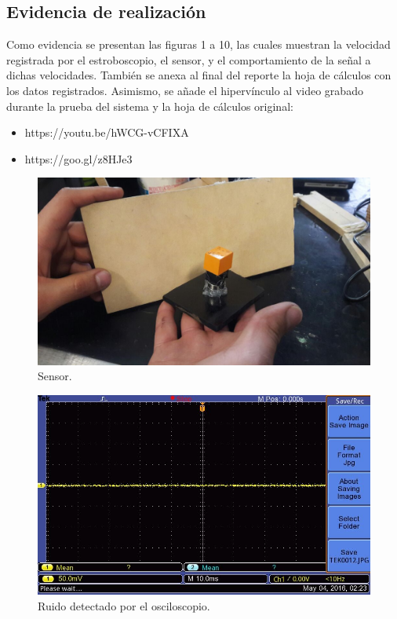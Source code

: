
\subsection{Evidencia de realizaci\'on}
Como evidencia se presentan las figuras 1 a 10, las cuales muestran la velocidad registrada por el
estroboscopio, el sensor, y el comportamiento de la se\~nal a dichas velocidades. Tambi\'en se anexa al final
del reporte la hoja de c\'alculos con los datos registrados. Asimismo, se a\~nade el hiperv\'inculo
al video grabado durante la prueba del sistema y la hoja de c\'alculos original:
\begin{itemize}
 \item https://youtu.be/hWCG-vCFIXA
 \item https://goo.gl/z8HJe3
\end{itemize}


\begin{figure}[!htbp]
 \centering
 \includegraphics [scale=0.25]
 {./img/WhatsApp-Image-20160504.jpg}
  \caption{Sensor.}
 \end{figure}

  \begin{figure}[!htbp]
 \centering
 \includegraphics [scale=0.25]
 {./img/tek0012.jpg}
  \caption{Ruido detectado por el osciloscopio.}
 \end{figure}

